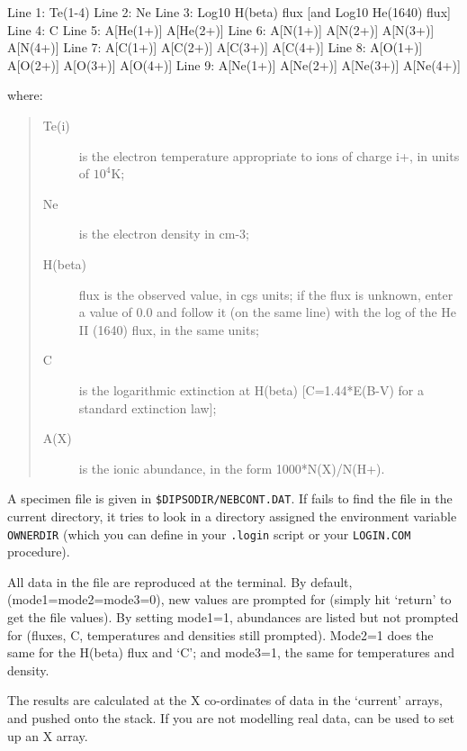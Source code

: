 \documentclass[twoside,11pt,noabs,nolof]{starlink}
\begin{document}
\begin{terminalv}
Line 1: Te(1-4)
Line 2: Ne
Line 3: Log10 H(beta) flux [and Log10 He(1640) flux]
Line 4: C
Line 5: A[He(1+)] A[He(2+)]
Line 6: A[N(1+)] A[N(2+)] A[N(3+)] A[N(4+)]
Line 7: A[C(1+)] A[C(2+)] A[C(3+)] A[C(4+)]
Line 8: A[O(1+)] A[O(2+)] A[O(3+)] A[O(4+)]
Line 9: A[Ne(1+)] A[Ne(2+)] A[Ne(3+)] A[Ne(4+)]
\end{terminalv}

where:

\begin{quote}
\begin{description}

\item [Te(i)] is the electron temperature appropriate to ions of
charge i+, in units of $10^{4}$K;

\item [Ne] is the electron density in cm-3;

\item [H(beta)] flux is the observed value, in cgs units; if the flux
is unknown, enter a value of 0.0 and follow it (on the same line) with
the log of the He II (1640) flux, in the same units;

\item [C] is the logarithmic extinction at H(beta) [C=1.44*E(B-V) for
a standard extinction law];

\item [A(X)] is the ionic abundance, in the form 1000*N(X)/N(H+).

\end{description}
\end{quote}

A specimen file is given in {\texttt{\$DIPSODIR/NEBCONT.DAT}}.
If   fails to find the
file in the current directory, it tries to look in a directory
assigned the environment variable {\texttt{OWNERDIR}}  (which
you can define in your {\texttt{.login}}  script or your {\texttt{LOGIN.COM}}  procedure).

All data in the file are reproduced at the terminal. By default,
(mode1=mode2=mode3=0), new values are prompted for (simply hit
`return' to get the file values). By setting mode1=1, abundances are
listed but not prompted for (fluxes, C, temperatures and densities
still prompted). Mode2=1 does the same for the H(beta) flux and `C';
and mode3=1, the same for temperatures and density.

The results are calculated at the X co-ordinates of data in the
`current' arrays, and pushed onto the stack. If you are not modelling
real data,   can be used to set up an X array.
\end{document}
